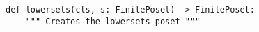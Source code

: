 \begin{verbatim}
def lowersets(cls, s: FinitePoset) -> FinitePoset:
    """ Creates the lowersets poset """
\end{verbatim}